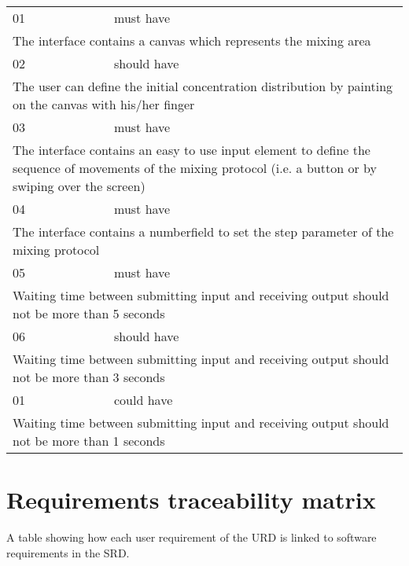 \begin{center}
\begin{tabular}{ p{} p{}}

01 & must have \\
\multicolumn{2}{p{\textwidth}}{The interface contains a canvas which represents the mixing area} \\
\hline

02 & should have \\
\multicolumn{2}{p{\textwidth}}{The user can define the initial concentration distribution by painting on the canvas with his/her finger} \\
\hline

03 & must have \\
\multicolumn{2}{p{\textwidth}}{The interface contains an easy to use input element to define the sequence of movements of the mixing protocol (i.e. a button or by swiping over the screen)} \\
\hline

04 & must have \\
\multicolumn{2}{p{\textwidth}}{The interface contains a numberfield to set the step parameter of the mixing protocol} \\
\hline

05 & must have \\
\multicolumn{2}{p{\textwidth}}{Waiting time between submitting input and receiving output should not be more than 5 seconds} \\
\hline

06 & should have \\
\multicolumn{2}{p{\textwidth}}{Waiting time between submitting input and receiving output should not be more than 3 seconds} \\
\hline

01 & could have \\
\multicolumn{2}{p{\textwidth}}{Waiting time between submitting input and receiving output should not be more than 1 seconds} \\
\hline

\end{tabular}
\end{center}

\chapter{Requirements traceability matrix}
A table showing how each user requirement of the URD is linked to software requirements in the SRD.


